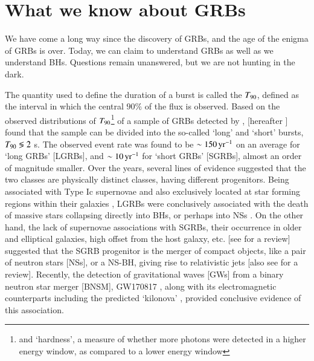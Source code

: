 \section{What we know about GRBs}
\label{sec:what_we_know}
We have come a long way since the discovery of GRBs, and the age of the enigma of GRBs is over. Today, we can claim to understand GRBs as well as we understand BHs. Questions remain unanswered, but we are not hunting in the dark.

The quantity used to define the duration of a burst is called the $T_{\rm{90}}$, defined as the interval in which the central $90 \%$ of the flux is observed. Based on the observed distributions of $T_{\rm{90}}$\footnote{and `hardness', a measure of whether more photons were detected in a higher energy window, as compared to a lower energy window} of a sample of GRBs detected by \B, \cite{Kouveliotou_et_al.-1993-ApJ} [hereafter ] found that the sample can be divided into the so-called `long' and `short' bursts, $T_{\rm{90}} \lessgtr 2$ s. The observed event rate was found to be $\sim 150 \, {\rm yr^{-1}}$ on an average for `long GRBs' [LGRBs], and $\sim 10 \, {\rm yr^{-1}}$ for `short GRBs' [SGRBs], almost an order of magnitude smaller. Over the years, several lines of evidence suggested that the two classes are physically distinct classes, having different progenitors. Being associated with Type Ic supernovae \citep{Woosley_and_Bloom-2006-ARA&A} and also exclusively located at star forming regions within their galaxies \citep{Wainwright_et_al.-2007-ApJ, Fruchter_et_al.-2006-Nature}, LGRBs were conclusively associated with the death of massive stars collapsing directly into BHs, or perhaps into NSs \citep{MacFayden_and_Woosley-1999-ApJ, Woosley_and_MacFayden-1999-A&AS}. On the other hand, the lack of supernovae associations with SGRBs, their occurrence in older and elliptical galaxies, high offset from the host galaxy, etc. [see \cite{Berger-2014-sGRB_review} for a review] suggested that the SGRB progenitor is the merger of compact objects, like a pair of neutron stars [NSs], or a NS-BH, giving rise to relativistic jets \citep{Eichler_et_al.-1989-Nature, Narayan_et_al.-1992-ApJ} [also see \cite{Nakar-2007-PhR} for a review]. Recently, the detection of gravitational waves [GWs] from a binary neutron star merger [BNSM], GW170817 \citep{GW170817-2017}, along with its electromagnetic counterparts including the predicted `kilonova' \citep{EM170817-2017}, provided conclusive evidence of this association.

